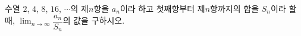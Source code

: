 수열 $2$, $4$, $8$, $16$, $\cdots$의 제$n$항을 $a_n$이라 하고 첫째항부터 제$n$항까지의 합을 $S_n$이라 할 때, $\displaystyle\lim_{n\to\infty}\dfrac{a_n}{S_n}$의 값을 구하시오.
